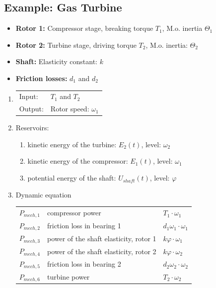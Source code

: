 \documentclass[10pt,a4paper]{scrartcl}
\begin{document}
\begin{multicols*}{3}
\begin{enumerate}
\end{enumerate}


\subsection{Example: Gas Turbine}\label{GasTurbine}


\scriptsize
\begin{itemize}
\item\textbf{Rotor 1:} Compressor stage, breaking torque $T_1$, M.o. inertia $\Theta_1$
\item\textbf{Rotor 2:} Turbine stage, driving torque $T_2$, M.o. inertia: $\Theta_2$
\item\textbf{Shaft:} Elasticity constant: $k$
\item\textbf{Friction losses:} $d_1$ and $d_2$
\end{itemize}
\normalsize


\begin{enumerate}
\item \begin{tabular}{ll}Input: & $T_1$ and $T_2$\\ Output: & Rotor speed: $\omega_1$\end{tabular}
\item Reservoirs:
\begin{enumerate}
\item kinetic energy of the turbine: $E_2(t)$, level: $\omega_2$
\item kinetic energy of the compressor: $E_1(t)$, level: $\omega_1$
\item potential energy of the shaft: $U_{shaft}(t)$, level: $\varphi$
\end{enumerate}
\item Dynamic equation

\small \begin{tabular}{l@{ = }l@{ = }l}
$P_{mech,1}$&compressor power& $T_1\cdot \omega_1$\\
$P_{mech,2}$&friction loss in bearing 1& $d_1\omega_1\cdot \omega_1$\\
$P_{mech,3}$&power of the shaft elasticity, rotor 1&$k\varphi\cdot\omega_1$\\
$P_{mech,4}$&power of the shaft elasticity, rotor 2&$k\varphi\cdot\omega_2$\\
$P_{mech,5}$&friction loss in bearing 2&$d_2\omega_2\cdot\omega_2$\\
$P_{mech,6}$&turbine power&$T_2\cdot\omega_2$
\end{tabular}
\normalsize


\end{enumerate}
\end{multicols*}
\end{document}
